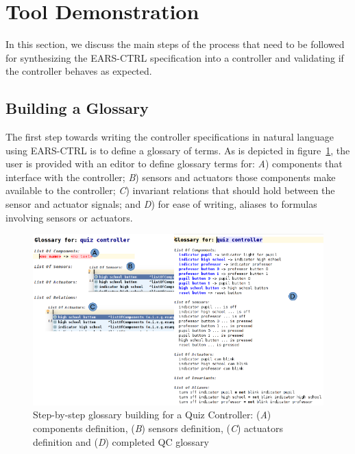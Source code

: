 \vspace{-.5cm}
\section{Tool Demonstration}
\label{sec:demo}
\vspace{-.3cm}
In this section, we discuss the main steps of the process that need to be
followed for synthesizing the EARS-CTRL specification into a controller and
validating if the controller behaves as expected.
\vspace{-.6cm}
\subsection{Building a Glossary}
\vspace{-.3cm}
The first step towards writing the controller specifications in natural
language using \textsf{EARS-CTRL} is to define a glossary of terms. 
As is depicted in figure~\ref{fig:glossary_def}, the user is provided with an
editor to define glossary terms for: \emph{A}) components that interface
with the controller; \emph{B}) sensors and actuators those components make
available to the controller; \emph{C}) invariant relations that should hold
between the sensor and actuator signals; and \emph{D}) for ease of writing,
aliases to formulas involving sensors or actuators.
\vspace{-.2cm}
\begin{figure}[!h]
\centering
\includegraphics[width=1\textwidth]{./images/QC_Glossary_Def.png}
\caption{Step-by-step glossary building for a Quiz Controller: (\emph{A})
components definition, (\emph{B}) sensors definition, (\emph{C}) actuators
definition and (\emph{D}) completed QC glossary}
\label{fig:glossary_def}
\vspace{-.8cm}
\end{figure}
